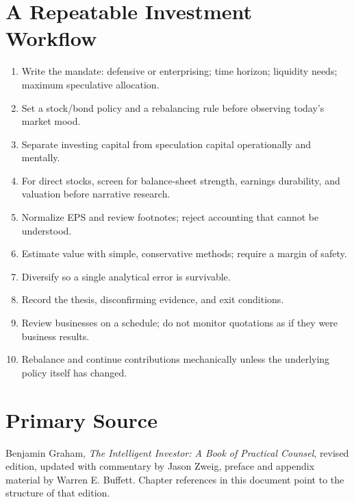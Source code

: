 \documentclass[11pt]{article}
\begin{document}
\section{A Repeatable Investment Workflow}
\begin{enumerate}
\item Write the mandate: defensive or enterprising; time horizon; liquidity needs; maximum speculative allocation.
\item Set a stock/bond policy and a rebalancing rule before observing today's market mood.
\item Separate investing capital from speculation capital operationally and mentally.
\item For direct stocks, screen for balance-sheet strength, earnings durability, and valuation before narrative research.
\item Normalize EPS and review footnotes; reject accounting that cannot be understood.
\item Estimate value with simple, conservative methods; require a margin of safety.
\item Diversify so a single analytical error is survivable.
\item Record the thesis, disconfirming evidence, and exit conditions.
\item Review businesses on a schedule; do not monitor quotations as if they were business results.
\item Rebalance and continue contributions mechanically unless the underlying policy itself has changed.
\end{enumerate}

\section*{Primary Source}
Benjamin Graham, \textit{The Intelligent Investor: A Book of Practical Counsel}, revised edition, updated with commentary by Jason Zweig, preface and appendix material by Warren E. Buffett. Chapter references in this document point to the structure of that edition.
\end{document}
